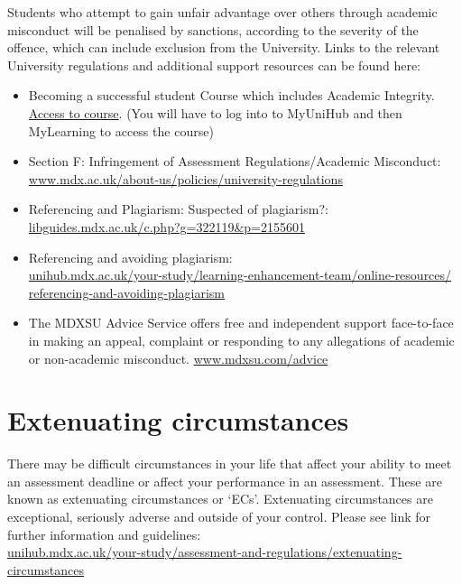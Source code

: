 \documentclass{MDXHandbook}
\begin{document}
Students who attempt to gain unfair advantage over others through academic misconduct  will be penalised by sanctions, according to the severity of the offence, which can include exclusion from the University. Links to the relevant University regulations and additional support resources can be found here: 
\begin{itemize}
	\item Becoming a successful student Course which includes Academic Integrity. \href{https://mdx.mrooms.net/mod/lesson/view.php?id=877307}{Access to course}. (You will have to log into to MyUniHub and then MyLearning to access the course)
	\item Section F: Infringement of Assessment Regulations/Academic Misconduct:\\
		\url{www.mdx.ac.uk/about-us/policies/university-regulations}
	\item Referencing and Plagiarism: Suspected of plagiarism?:\\
		\url{libguides.mdx.ac.uk/c.php?g=322119&p=2155601}
	\item Referencing and avoiding plagiarism:\\
		\href{unihub.mdx.ac.uk/your-study/learning-enhancement-team/online-resources/referencing-and-avoiding-plagiarism}{\url{unihub.mdx.ac.uk/your-study/learning-enhancement-team/online-resources/}\\ \url{referencing-and-avoiding-plagiarism}}
	\item The MDXSU Advice Service offers free and independent support face-to-face in making an appeal, complaint or responding to any allegations of academic or non-academic misconduct. 
		\url{www.mdxsu.com/advice}
\end{itemize}

\section*{Extenuating circumstances}
There may be difficult circumstances in your life that affect your ability to meet an assessment deadline or affect your performance in an assessment. These are known as extenuating circumstances or `ECs'. Extenuating circumstances are exceptional, seriously adverse and outside of your control. Please see link for further information and guidelines: \\
\url{unihub.mdx.ac.uk/your-study/assessment-and-regulations/extenuating-circumstances}
\end{document}
